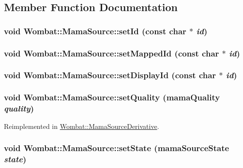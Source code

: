 \subsection{Member Function Documentation}
\hypertarget{classWombat_1_1MamaSource_aef52459f15922b8624097071801b7195}{
\subsubsection[{setId}]{\setlength{\rightskip}{0pt plus 5cm}void Wombat::MamaSource::setId (const char $\ast$ {\em id})}}
\label{classWombat_1_1MamaSource_aef52459f15922b8624097071801b7195}
\hypertarget{classWombat_1_1MamaSource_a24281e142f2e8a84efb1727f17f094bb}{
\subsubsection[{setMappedId}]{\setlength{\rightskip}{0pt plus 5cm}void Wombat::MamaSource::setMappedId (const char $\ast$ {\em id})}}
\label{classWombat_1_1MamaSource_a24281e142f2e8a84efb1727f17f094bb}
\hypertarget{classWombat_1_1MamaSource_a723e221b72e418d13bbef84b101b4faa}{
\subsubsection[{setDisplayId}]{\setlength{\rightskip}{0pt plus 5cm}void Wombat::MamaSource::setDisplayId (const char $\ast$ {\em id})}}
\label{classWombat_1_1MamaSource_a723e221b72e418d13bbef84b101b4faa}
\hypertarget{classWombat_1_1MamaSource_afe18fd5c7376c482d212505c9258b8dd}{
\subsubsection[{setQuality}]{\setlength{\rightskip}{0pt plus 5cm}void Wombat::MamaSource::setQuality (mamaQuality {\em quality})}}
\label{classWombat_1_1MamaSource_afe18fd5c7376c482d212505c9258b8dd}


Reimplemented in \hyperlink{classWombat_1_1MamaSourceDerivative_aef1c1007d75a298118d421aea1467230}{Wombat::MamaSourceDerivative}.\hypertarget{classWombat_1_1MamaSource_ac51271403c954b64180618a6b255e476}{
\subsubsection[{setState}]{\setlength{\rightskip}{0pt plus 5cm}void Wombat::MamaSource::setState (mamaSourceState {\em state})}}
\label{classWombat_1_1MamaSource_ac51271403c954b64180618a6b255e476}


